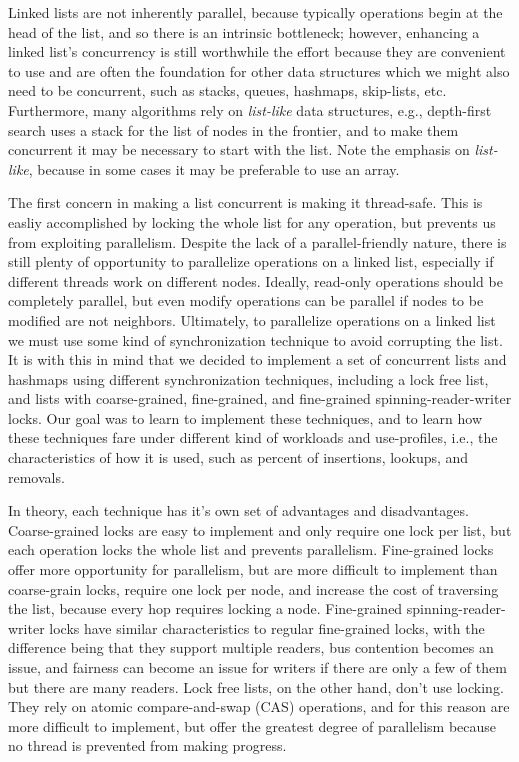 \documentclass[11pt]{article}
\begin{document}
Linked lists are not inherently parallel, because typically operations begin at
the head of the list, and so there is an intrinsic bottleneck; however,
enhancing a linked list's concurrency is still worthwhile the effort because
they are convenient to use and are often the foundation for other data
structures which we might also need to be concurrent, such as stacks, queues,
hashmaps, skip-lists, etc. Furthermore, many algorithms rely on {\em list-like}
data structures, e.g., depth-first search uses a stack for the list of nodes in
the frontier, and to make them concurrent it may be necessary to start with the
list. Note the emphasis on {\em list-like}, because in some cases it may be
preferable to use an array.

The first concern in making a list concurrent is making it thread-safe. This is
easliy accomplished by locking the whole list for any operation, but prevents us
from exploiting parallelism. Despite the lack of a parallel-friendly nature,
there is still plenty of opportunity to parallelize operations on a linked list,
especially if different threads work on different nodes. Ideally, read-only
operations should be completely parallel, but even modify operations can be
parallel if nodes to be modified are not neighbors. Ultimately, to parallelize
operations on a linked list we must use some kind of synchronization technique
to avoid corrupting the list. It is with this in mind that we decided to implement
a set of concurrent lists and hashmaps using different synchronization techniques,
including a lock free list, and lists with coarse-grained, fine-grained, and
fine-grained spinning-reader-writer locks. Our goal was to learn to implement
these techniques, and to learn how these techniques fare under different kind of
workloads and use-profiles, i.e., the characteristics of how it is used, such as
percent of insertions, lookups, and removals.

In theory, each technique has it's own set of advantages and disadvantages.
Coarse-grained locks are easy to implement and only require one lock per list,
but each operation locks the whole list and prevents parallelism. Fine-grained
locks offer more opportunity for parallelism, but are more difficult to
implement than coarse-grain locks, require one lock per node, and increase the
cost of traversing the list, because every hop requires locking a node.
Fine-grained spinning-reader-writer locks have similar characteristics to
regular fine-grained locks, with the difference being that they support multiple
readers, bus contention becomes an issue, and fairness can become an issue for
writers if there are only a few of them but there are many readers. Lock free
lists, on the other hand, don't use locking. They rely on atomic
compare-and-swap (CAS) operations, and for this reason are more difficult to
implement, but offer the greatest degree of parallelism because no thread is
prevented from making progress.
\end{document}
